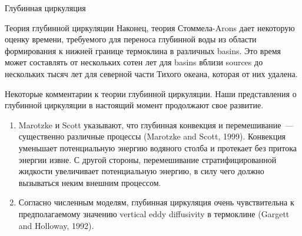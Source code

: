 \begin{chapter}{Глубинная циркуляция}
\begin{section}{Теория глубинной циркуляции}
Наконец, теория Стоммела-Arons дает некоторую оценку времени, требуемого для
переноса глубинной воды из области формирования к нижней границе 
термоклина в различных basins. Это время может составлять
от нескольких сотен лет для basins вблизи sources до нескольких тысяч лет
для северной части Тихого океана, которая от них 
удалена.
%

\begin{paragraph}{Некоторые комментарии к теории глубинной циркуляции.} 
Наши представления о глубинной циркуляции в настоящий момент продолжают 
свое развитие.
\begin{enumerate}
\item 
Marotzke и Scott указывают, что глубинная конвекция и 
перемешивание~--- существенно различные
процессы (Marotzke and Scott, 1999). Конвекция уменьшает потенциальную 
энергию водяного столба и протекает без притока энергии извне. С другой
стороны, перемешивание стратифицированной жидкости увеличивает потенциальную
энергию, в силу чего должно вызываться неким внешним процессом.
%

\item
Согласно численным моделям, глубинная циркуляция очень чувствительна к 
предполагаемому значению vertical eddy diffusivity в
термоклине (Gargett and
Holloway, 1992).
%


\end{enumerate}
\end{paragraph}
\end{section}
\end{chapter}
